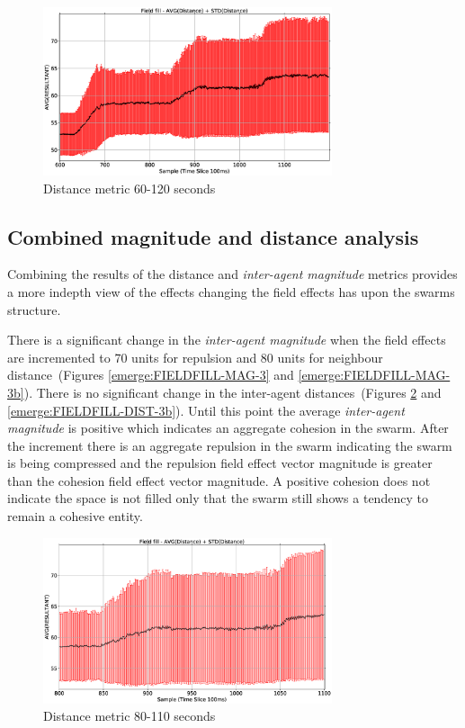 \documentclass[10pt,journal,letterpaper,twoside]{IEEEtran}
\begin{document}
\begin{figure}
\begin{center}
\includegraphics[width=8.5cm]{figures/FIELDFILL-DIST-2}
\end{center}
\caption{Distance metric 60-120 seconds\label{emerge:FIELDFILL-DIST-2}}
\end{figure}

\subsection{Combined magnitude and distance analysis}
Combining the results of the distance and \textit{inter-agent magnitude} metrics provides a more indepth view of the effects changing the field effects has upon the swarms structure.

There is a significant change in the \textit{inter-agent magnitude} when the field effects are incremented to 70 units for repulsion and 80 units for neighbour distance~(Figures \ref{emerge:FIELDFILL-MAG-3} and \ref{emerge:FIELDFILL-MAG-3b}). There is no significant change in the inter-agent distances~(Figures \ref{emerge:FIELDFILL-DIST-3} and \ref{emerge:FIELDFILL-DIST-3b}). Until this point the average \textit{inter-agent magnitude} is positive which indicates an aggregate cohesion in the swarm. After the increment there is an aggregate repulsion in the swarm indicating the swarm is being compressed and the repulsion field effect vector magnitude is greater than the cohesion field effect vector magnitude. A positive cohesion does not indicate the space is not filled only that the swarm still shows a tendency to remain a cohesive entity.

\begin{figure}
\begin{center}
\includegraphics[width=8.5cm]{figures/FIELDFILL-DIST-3}
\end{center}
\caption{Distance metric 80-110 seconds\label{emerge:FIELDFILL-DIST-3}}
\end{figure}
\end{document}

